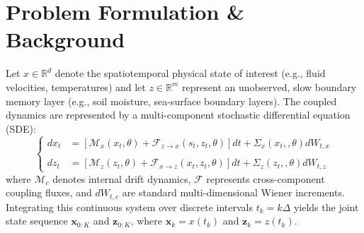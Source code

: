 \documentclass[10pt]{article}
\begin{document}
\section{Problem Formulation \& Background}
\label{sec: bgd}
Let $x \in \mathbb{R}^d$ denote the spatiotemporal physical state of interest (e.g., fluid velocities, temperatures) and let $z \in \mathbb{R}^m$ represent an unobserved, slow boundary memory layer (e.g., soil moisture, sea-surface boundary layers). The coupled dynamics are represented by a multi-component stochastic differential equation (SDE):
\begin{equation}
    \label{eq: time-continuous coupled OAL dynamics}
    \left \{
    \begin{array}{cc}
    d{x}_t &= \left[\mathcal{M}_{x}({x}_t, {\theta}) + \mathcal{F}_{{z} \rightarrow {x}}({s}_t, {z}_t, {\theta})\right] dt + \Sigma_{x}({x}_t,, {\theta}) dW_{t,{x}}  \\~\\
    d{z}_t &= \left[\mathcal{M}_{z}({z}_t, {\theta}) + \mathcal{F}_{x \rightarrow z}({x}_t, {z}_t, \theta)\right] dt + \Sigma_{z}({z}_t,, {\theta}) dW_{t,{z}}
    \end{array}\right.
\end{equation}
where $\mathcal{M}_c$ denotes internal drift dynamics, $\mathcal{F}$ represents cross-component coupling fluxes, and $dW_{t,c}$ are standard multi-dimensional Wiener increments. Integrating this continuous system over discrete intervals $t_k = k \Delta$ yields the joint state sequence $\mathbf{x}_{0:K}$ and $\mathbf{z}_{0:K}$, where $\mathbf{x}_k=x(t_k)$ and $\mathbf{z}_k=z(t_k)$.
\end{document}
